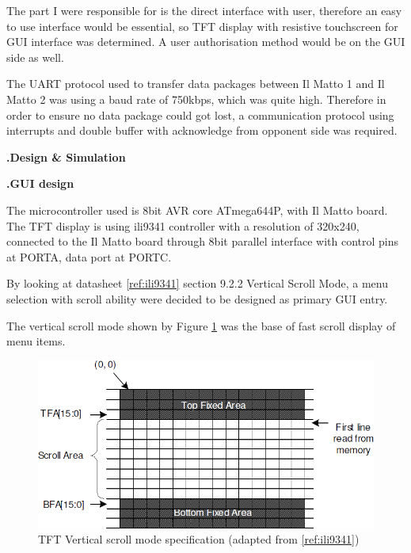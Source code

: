 \documentclass[a4paper,notitlepage,10pt]{report}
\newcommand{\tab}{\hspace{0.75cm}}
\newcommand{\fontHeading}{\fontsize{12pt}{13.2pt}\selectfont}
\newcommand{\fontSubHeading}{\fontsize{10pt}{11pt}\selectfont}
\newcommand{\fontBody}{\fontsize{10pt}{11pt}\selectfont}
\newcounter{sections}
\newcounter{subsections}[sections]
\begin{document}
\begin{multicols}{2}
\fontBody
The part I were responsible for is the direct interface with user, therefore an easy to use interface would be essential, so TFT display with resistive touchscreen for GUI interface was determined. A user authorisation method would be on the GUI side as well.
\vspace{6pt}

The UART protocol used to transfer data packages between Il Matto 1 and Il Matto 2 was using a baud rate of 750kbps, which was quite high. Therefore in order to ensure no data package could got lost, a communication protocol using interrupts and double buffer with acknowledge from opponent side was required.
\vspace{10pt}

\fontHeading
{}
\textbf{\thesections.\tab Design \& Simulation}
\vspace{10pt}

\fontSubHeading
{}
\textbf{\thesections.\thesubsections\tab GUI design}
\vspace{6pt}

\fontBody
The microcontroller used is 8bit AVR core ATmega644P, with Il Matto board. The TFT display is using ili9341 controller with a resolution of 320x240, connected to the Il Matto board through 8bit parallel interface with control pins at PORTA, data port at PORTC.
\vspace{6pt}

By looking at datasheet \ref{ref:ili9341} section 9.2.2 Vertical Scroll Mode, a menu selection with scroll ability were decided to be designed as primary GUI entry.
\vspace{6pt}

The vertical scroll mode shown by Figure \ref{fig:tftVS} was the base of fast scroll display of menu items.
\vspace{6pt}

\begin{figure}[H]
	\centering
	\includegraphics[width=0.9\columnwidth]{tft_vs}
	\caption{TFT Vertical scroll mode specification (adapted from \ref{ref:ili9341})}
	\label{fig:tftVS}
\end{figure}
\vspace{6pt}


\end{multicols}
\end{document}
